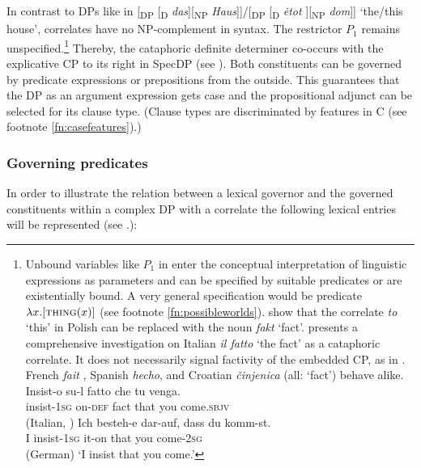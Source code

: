 \documentclass[output=paper,
colorlinks,
citecolor=brown,
newtxmath
]{langscibook}
\begin{document}
In contrast to DPs like in [\textsubscript{DP} [\textsubscript{D} \textit{das}][\textsubscript{NP} \textit{Haus}]]/[\textsubscript{DP} [\textsubscript{D} \textit{ėtot} ][\textsubscript{NP} \textit{dom}]] `the/this house', correlates have no NP-complement in syntax. The restrictor $P_1$ remains unspecified.\footnote{Unbound variables like $P_1$ in  enter the conceptual interpretation of linguistic expressions as parameters and can be specified by suitable predicates or are existentially bound. A very general specification would be  predicate $\lambda x.[\textsc{thing} (x)]$ (see footnote \ref{fn:possibleworlds}). \citet[67]{BondarukRozwadowskaWitkowski2017} show that the correlate \textit{to} `this' in Polish can be replaced with the noun \textit{fakt} `fact'. \citet[2.4]{Mollica2010} presents a comprehensive investigation on Italian \textit{il fatto} `the fact' as a cataphoric correlate. It does not necessarily signal factivity of the embedded CP, as in . French \textit{fait} , Spanish \textit{hecho}, and Croatian \textit{činjenica} (all: `fact') behave alike.
        \ea\label{ex:Italian1}
        \ea\gll Insist-o su-l fatto che tu venga.\\
        insist-\textsc{1sg} on-\textsc{def} fact that you come.\textsc{sbjv}\\ \hfill (Italian, \citealt[240]{Mollica2010})
        \ex
        \gll Ich besteh-e dar-auf, dass du komm-st.\\
        I insist-\textsc{1sg} {it-on} that you come-\textsc{2sg}\\ \hfill (German)
        \z
        \glt `I insist that you come.'
        \z
} Thereby, the cataphoric definite determiner co-occurs with the explicative CP to its right in SpecDP (see ). Both constituents can be governed by predicate expressions or prepositions from the outside. This guarantees that the DP as an argument expression gets case and the propositional adjunct can be selected for its clause type. (Clause types are discriminated by features in C (see footnote \ref{fn:casefeatures}).)


\subsubsection{Governing predicates}\label{s:2.3.2}

In order to illustrate the relation between a lexical governor and the governed constituents within a complex DP with a correlate the following lexical entries will be represented (see \citet[42--45]{Zimmermann2016a}.):
\end{document}
